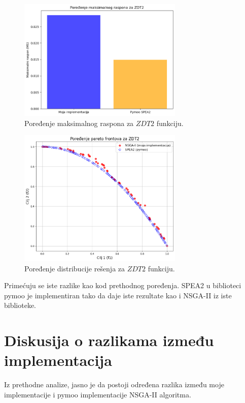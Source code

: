 \documentclass[12pt]{article}
\begin{document}
\begin{figure}[H]
    \centering
    \includegraphics[width=0.7\textwidth]{images/ms_spea2.png}
    \caption{Poređenje maksimalnog raspona za \( ZDT2 \) funkciju.}
    \label{fig:ms_spea2}
\end{figure}

\begin{figure}[H]
    \centering
    \includegraphics[width=0.7\textwidth]{images/pareto_spea2.png}
    \caption{Poređenje distribucije rešenja za \( ZDT2 \) funkciju.}
    \label{fig:pareto_spea2}
\end{figure}

Primećuju se iste razlike kao kod prethodnog poređenja. SPEA2 u biblioteci pymoo je implementiran tako da daje iste rezultate kao i NSGA-II iz iste biblioteke.


\section{Diskusija o razlikama između implementacija}
Iz prethodne analize, jasno je da postoji određena razlika između moje implementacije i pymoo implementacije NSGA-II algoritma.
\end{document}
